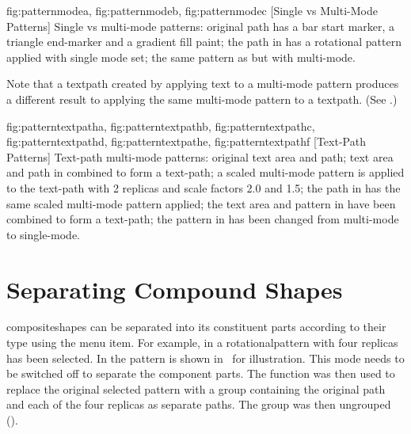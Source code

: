 {
  {fig:patternmodea}{}{},
  {fig:patternmodeb}{}{},
  {fig:patternmodec}{}{}
}
[Single vs Multi-Mode Patterns]
{Single vs multi-mode patterns:
 original path
has a bar start marker, a triangle end-marker and a gradient fill paint;
 the path in  has
a rotational pattern applied with single mode set;
 the same pattern 
as  but with multi-mode.}

Note that a \gls{textpath} created by applying text to a multi-mode
pattern produces a different result to applying the same multi-mode
pattern to a \gls{textpath}. (See .)

{
  {fig:patterntextpatha}{}{},
  {fig:patterntextpathb}{}{},
  {fig:patterntextpathc}{}{},
  {fig:patterntextpathd}{}{},
  {fig:patterntextpathe}{}{},
  {fig:patterntextpathf}{}{}
}
[Text-Path Patterns]
{Text-path multi-mode patterns:
 original text area and path;
 text area and path in
 combined to form a text-path;
 a scaled
multi-mode pattern is applied to the text-path with 2 replicas and scale
factors 2.0 and 1.5;
 the path in  has
the same scaled multi-mode pattern applied;
 the text area and
pattern in  have been combined to form a
text-path;
 the pattern in  has
been changed from multi-mode to single-mode.}


\section{Separating Compound Shapes}\label{sec:separate}


\Glspl{compositeshape} can be separated into its constituent parts
according to their type using the  menu
item.  For example, in  a
\gls{rotationalpattern} with four replicas has been selected. In
 the pattern is shown in
\editpathmode\ for illustration. This mode needs to be switched off
to separate the component parts. The  function
was then used to replace the original selected \gls{pattern} with a
group containing the original path and each of the four replicas as
separate \glspl{path}. The group was then ungrouped
().

